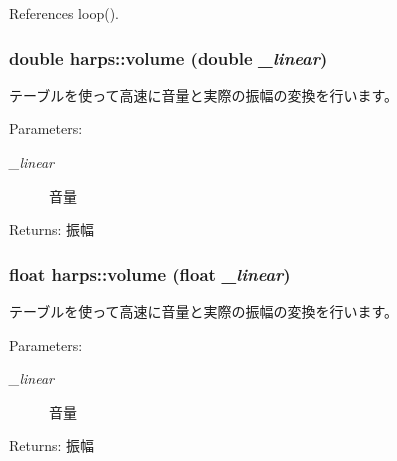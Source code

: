 References loop().
\subsubsection[volume]{\setlength{\rightskip}{0pt plus 5cm}double harps::volume (double {\em \_\-linear})\hspace{0.3cm}{\tt  [inline]}}\label{namespaceharps_561f42a6eddee3829c8e429b1209fc7e}


テーブルを使って高速に音量と実際の振幅の変換を行います。 \begin{Desc}
\item[Parameters:]
\begin{description}
\item[{\em \_\-linear}]音量 \end{description}
\end{Desc}
\begin{Desc}
\item[Returns:]振幅 \end{Desc}
\subsubsection[volume]{\setlength{\rightskip}{0pt plus 5cm}float harps::volume (float {\em \_\-linear})\hspace{0.3cm}{\tt  [inline]}}\label{namespaceharps_2d3449b08861e19e466414aed28d4f22}


テーブルを使って高速に音量と実際の振幅の変換を行います。 \begin{Desc}
\item[Parameters:]
\begin{description}
\item[{\em \_\-linear}]音量 \end{description}
\end{Desc}
\begin{Desc}
\item[Returns:]振幅 \end{Desc}
